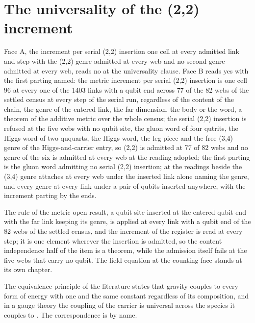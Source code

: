 \section{The universality of the (2,2) increment}\label{mod:X-2-D542409-w-unmi}
\begin{chwall}\label{box:X-2-D542409-w-unmi:1}
Face A, the increment per serial (2,2) insertion one cell at every admitted link and step with the (2,2) genre admitted at every web and no second genre admitted at every web, reads no at the universality clause. Face B reads yes with the first parting named: the metric increment per serial (2,2) insertion is one cell 96 at every one of the 1403 links with a qubit end across 77 of the 82 webs of the settled census at every step of the serial run, regardless of the content of the chain, the genre of the entered link, the far dimension, the body or the word, a theorem of the additive metric over the whole census; the serial (2,2) insertion is refused at the five webs with no qubit site, the gluon word of four qutrits, the Higgs word of two ququarts, the Higgs word, the leg piece and the free (3,4) genre of the Higgs-and-carrier entry, so (2,2) is admitted at 77 of 82 webs and no genre of the six is admitted at every web at the reading adopted; the first parting is the gluon word admitting no serial (2,2) insertion; at the readings beside the (3,4) genre attaches at every web under the inserted link alone naming the genre, and every genre at every link under a pair of qubits inserted anywhere, with the increment parting by the ends.
\end{chwall}
The rule of the metric open result, a qubit site inserted at the entered qubit end with the far link keeping its genre, is applied at every link with a qubit end of the 82 webs of the settled census, and the increment of the register is read at every step; it is one element wherever the insertion is admitted, so the content independence half of the item is a theorem, while the admission itself fails at the five webs that carry no qubit. The field equation at the counting face stands at its own chapter.
\begin{chbridge}
The equivalence principle of the literature states that gravity couples to every form of energy with one and the same constant regardless of its composition, and in a gauge theory the coupling of the carrier is universal across the species it couples to \cite{Einstein1907,Will2014}. The correspondence is by name.
\end{chbridge}
